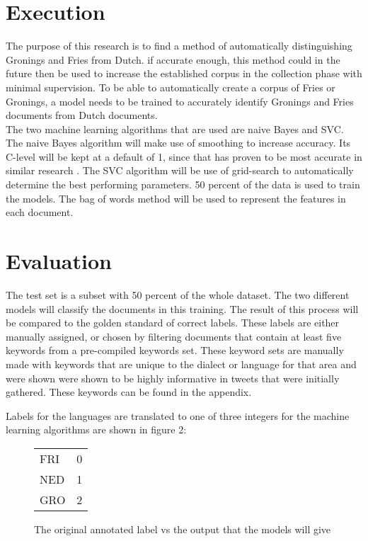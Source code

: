 \documentclass[
10pt, %
a4paper, %
oneside, %
headinclude,footinclude, %
] {book}%
\begin{document}
\section{Execution}
The purpose of this research is to find a method of automatically distinguishing Gronings and Fries from Dutch. if accurate enough, this method could in the future then be used to  increase the established corpus in the collection phase with minimal supervision.
To be able to automatically create a corpus of Fries or Gronings, a model needs to be trained to accurately identify Gronings and Fries documents from Dutch documents. \\
The two machine learning algorithms that are used are naive Bayes and SVC. The naive Bayes algorithm will make use of smoothing to increase accuracy. Its C-level will be kept at a default of 1, since that has proven to be most accurate in similar research \citep{limburg}. The SVC algorithm will be use of grid-search to automatically determine the best performing parameters. 50 percent of the data is used to train the models. The bag of words method will be used to represent the features in each document.


\section{Evaluation}

The test set is a subset with 50 percent of the whole dataset. The two different models will classify the documents in this training. The result of this process will be compared to the golden standard of correct labels. These labels are either manually assigned, or chosen by filtering documents that contain at least five keywords from a pre-compiled keywords set. These keyword sets are manually made with keywords that are unique to the dialect or language for that area and were shown were shown to be highly informative in tweets that were initially gathered. These keywords can be found in the appendix. 

Labels for the languages are translated to one of three integers for the machine learning algorithms are shown in figure 2:

\begin{figure}[h]
\begin{tabular}{ll}
	FRI & 0 \\
	NED & 1 \\
	GRO & 2 
\end{tabular}
	\caption{The original annotated label vs the output that the models will give}
\end{figure}
\end{document}
